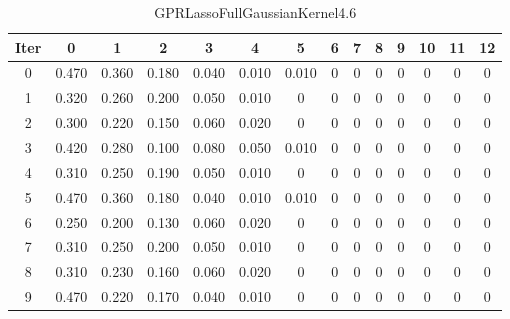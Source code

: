 \begin{table}
	\begin{center}
		\begin{tabular}{|c|c|c|c|c|c|c|c|c|c|c|c|c|c|}
			\hline
			Iter & 0 & 1 & 2 & 3 & 4 & 5 & 6 & 7 & 8 & 9 & 10 & 11 & 12 \\
			\hline
			0 & 0.470 & 0.360 & 0.180 & 0.040 & 0.010 & 0.010 & 0 & 0 & 0 & 0 & 0 & 0 & 0 \\
			\hline
			1 & 0.320 & 0.260 & 0.200 & 0.050 & 0.010 & 0 & 0 & 0 & 0 & 0 & 0 & 0 & 0 \\
			\hline
			2 & 0.300 & 0.220 & 0.150 & 0.060 & 0.020 & 0 & 0 & 0 & 0 & 0 & 0 & 0 & 0 \\
			\hline
			3 & 0.420 & 0.280 & 0.100 & 0.080 & 0.050 & 0.010 & 0 & 0 & 0 & 0 & 0 & 0 & 0 \\
			\hline
			4 & 0.310 & 0.250 & 0.190 & 0.050 & 0.010 & 0 & 0 & 0 & 0 & 0 & 0 & 0 & 0 \\
			\hline
			5 & 0.470 & 0.360 & 0.180 & 0.040 & 0.010 & 0.010 & 0 & 0 & 0 & 0 & 0 & 0 & 0 \\
			\hline
			6 & 0.250 & 0.200 & 0.130 & 0.060 & 0.020 & 0 & 0 & 0 & 0 & 0 & 0 & 0 & 0 \\
			\hline
			7 & 0.310 & 0.250 & 0.200 & 0.050 & 0.010 & 0 & 0 & 0 & 0 & 0 & 0 & 0 & 0 \\
			\hline
			8 & 0.310 & 0.230 & 0.160 & 0.060 & 0.020 & 0 & 0 & 0 & 0 & 0 & 0 & 0 & 0 \\
			\hline
			9 & 0.470 & 0.220 & 0.170 & 0.040 & 0.010 & 0 & 0 & 0 & 0 & 0 & 0 & 0 & 0 \\
			\hline
		\end{tabular}
	\end{center}
	\caption{GPRLassoFullGaussianKernel4.6}
\end{table}